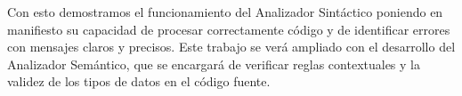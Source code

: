 \documentclass{article}
\begin{document}
Con esto demostramos el funcionamiento del Analizador Sintáctico poniendo en manifiesto su capacidad de procesar correctamente código y de identificar errores con mensajes claros y precisos. Este trabajo se verá ampliado con el desarrollo del Analizador Semántico, que se encargará de verificar reglas contextuales y la validez de los tipos de datos en el código fuente.

\newpage


\newpage
\end{document}
